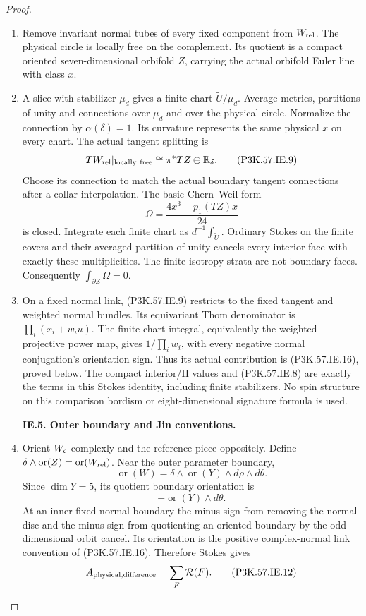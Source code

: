 \begin{proof}
\begin{enumerate}[label=\arabic*.]
\item Remove invariant normal tubes of every fixed
component from \(W_{\rm rel}\). The physical
circle is locally free on the complement.
Its quotient is a compact oriented
seven-dimensional orbifold \(Z\), carrying
the actual orbifold Euler line with class \(x\).

\item A slice with stabilizer \(\mu_d\) gives a
finite chart \(\widetilde U/\mu_d\). Average
metrics, partitions of unity and connections
over \(\mu_d\) and over the physical circle.
Normalize the connection by
\(\alpha(\delta)=1\). Its curvature represents
the same physical \(x\) on every chart. The
actual tangent splitting is
\[
 TW_{\rm rel}|_{\rm locally\ free}
                    \cong\pi^*TZ\oplus\mathbb R_\delta .      \tag{P3K.57.IE.9}
\]
Choose its connection to match the actual
boundary tangent connections after a collar
interpolation. The basic Chern--Weil form
\[
                      \Omega=\frac{4x^3-p_1(TZ)x}{24}         \tag{P3K.57.IE.10}
\]
is closed. Integrate each finite chart as
\(d^{-1}\int_{\widetilde U}\). Ordinary Stokes
on the finite covers and their averaged
partition of unity cancels every interior
face with exactly these multiplicities.
The finite-isotropy strata are not boundary
faces. Consequently
\(\int_{\partial Z}\Omega=0\).

\item On a fixed normal link, (P3K.57.IE.9) restricts
to the fixed tangent and weighted normal
bundles. Its equivariant Thom denominator
is \(\prod_i(x_i+w_i u)\). The finite
chart integral, equivalently the weighted
projective power map, gives
\(1/\prod_iw_i\), with every negative
normal conjugation's orientation sign.
Thus its actual contribution is (P3K.57.IE.16), proved below.
The compact interior/H values and (P3K.57.IE.8)
are exactly the terms in this Stokes
identity, including finite stabilizers.
No spin structure on this comparison
bordism or eight-dimensional signature
formula is used.

\par\medskip\noindent\textbf{IE.5. Outer boundary and Jin conventions.}\par\nopagebreak[4]

\item Orient \(W_{\rm c}\) complexly and the
reference piece oppositely. Define
\(\delta\wedge\operatorname{or}(Z)
=\operatorname{or}(W_{\rm rel})\).
Near the outer parameter boundary,
\[
 \operatorname{or}(W)
 =\delta\wedge\operatorname{or}(Y)
                  \wedge d\rho\wedge d\theta .
\]
Since \(\dim Y=5\), its quotient boundary
orientation is
\[
                         -\operatorname{or}(Y)\wedge d\theta.       \tag{P3K.57.IE.11}
\]
At an inner fixed-normal boundary the
minus sign from removing the normal disc
and the minus sign from quotienting an
oriented boundary by the odd-dimensional
orbit cancel. Its orientation is the
positive complex-normal link convention
of (P3K.57.IE.16). Therefore Stokes gives
\[
                 A_{\rm physical,difference}
                          =\sum_F\mathcal R(F).          \tag{P3K.57.IE.12}
\]


\end{enumerate}
\end{proof}
